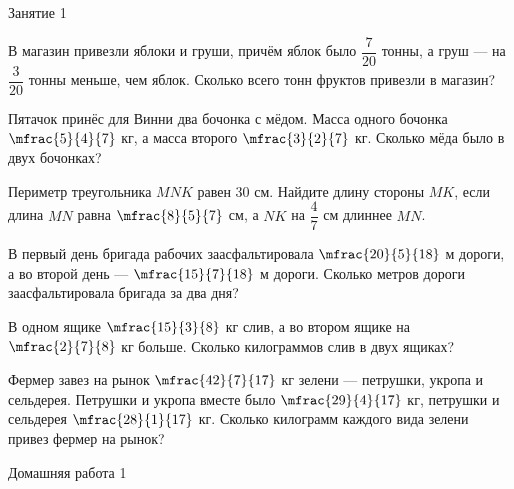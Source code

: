 %
%

\begin{class}[number=1]
	\begin{listofex}
		\item Занятие 1
	\end{listofex}
\end{class}

\begin{class}[number=2]
	\begin{listofex}
		\item В магазин привезли яблоки и груши, причём яблок было \( \dfrac{7}{20} \) тонны, а груш --- на \( \dfrac{3}{20}\) тонны меньше, чем яблок. Сколько всего тонн фруктов привезли в магазин?
		\item Пятачок принёс для Винни два бочонка с мёдом. Масса одного бочонка \( \mfrac{5}{4}{7} \) кг, а масса второго \( \mfrac{3}{2}{7} \) кг. Сколько мёда было в двух бочонках?
		\item Периметр треугольника \( MNK \) равен \( 30 \) см. Найдите длину стороны \( MK \), если длина \( MN \) равна \( \mfrac{8}{5}{7} \) см, а \( NK \) на \( \dfrac{4}{7} \) см длиннее \( MN \).
		\item В первый день бригада рабочих заасфальтировала \( \mfrac{20}{5}{18} \) м дороги, а во второй день --- \( \mfrac{15}{7}{18} \) м дороги. Сколько метров дороги заасфальтировала бригада за два дня?
		\item В одном ящике \( \mfrac{15}{3}{8} \) кг слив, а во втором ящике на \( \mfrac{2}{7}{8} \) кг больше. Сколько килограммов слив в двух ящиках?
		\item Фермер завез на рынок \( \mfrac{42}{7}{17} \)  кг зелени --- петрушки, укропа и сельдерея. Петрушки и укропа вместе было \( \mfrac{29}{4}{17} \) кг, петрушки и сельдерея \( \mfrac{28}{1}{17} \) кг. Сколько килограмм каждого вида зелени привез фермер на рынок?
	\end{listofex}
\end{class}

\begin{homework}[number=1]
	\begin{listofex}
		\item Домашняя работа 1
	\end{listofex}
\end{homework}

